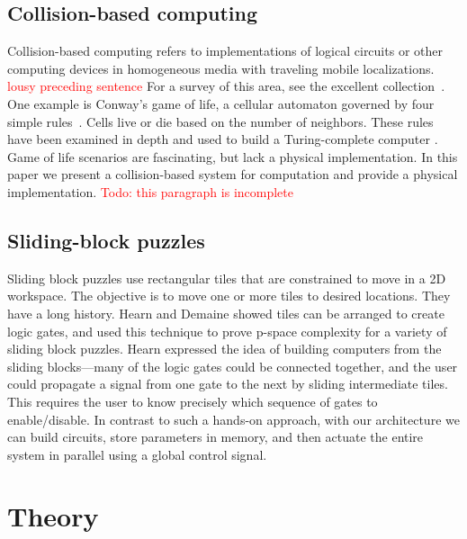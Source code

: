 \documentclass[letterpaper, 10 pt, conference]{ieeeconf}
\begin{document}
\subsection{Collision-based computing}
Collision-based computing refers to implementations of logical circuits or other computing devices in homogeneous media with traveling mobile localizations. \textcolor{red}{lousy preceding sentence}   For a survey of this area, see the excellent collection~\cite{Adamatzky2012}.  One example is Conway's game of life, a cellular automaton governed by four simple rules~\cite{berlekamp2001winning}. Cells live or die based on the number of neighbors. These rules have been examined in depth and used to build a Turing-complete computer \cite{Adamatzky2002}.  Game of life scenarios are fascinating, but lack a physical implementation.  In this paper we present a collision-based system for computation and provide a physical implementation.
\textcolor{red}{Todo: this paragraph is incomplete}


\subsection{Sliding-block puzzles}
Sliding block puzzles use rectangular tiles that are constrained to move in a 2D workspace. The objective is to move one or more tiles to desired locations. They have a long history.
Hearn \cite{hearn2005complexity} and Demaine \cite{Demaine2009} showed tiles can be arranged to create logic gates, and used this technique to prove {\sc p-space} complexity for a variety of sliding block puzzles.  Hearn expressed the idea of building computers from the sliding blocks---many of the logic gates could be connected together, and the user could propagate a signal from one gate to the next by sliding intermediate tiles.  This requires the user to know precisely which sequence of gates to enable/disable.  In contrast to such a hands-on approach, with our architecture we can build circuits, store parameters in memory, and then actuate the entire system in parallel using a global control signal.

\section{Theory}\label{sec:theory}
\end{document}
